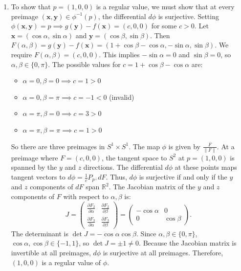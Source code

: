 \documentclass{article}
\begin{document}
\begin{enumerate}[label=\fbox{\arabic*}]
  \item %
        To show that $p = (1, 0, 0)$ is a regular value, we must show that at every preimage $(\boldsymbol{x}, \boldsymbol{y}) \in \phi^{-1}(p)$, the differential $d\phi$ is surjective.
        Setting $\phi(\boldsymbol{x}, \boldsymbol{y}) = p \implies g(\boldsymbol{y}) - f(\boldsymbol{x}) = (c, 0, 0)$ for some $c > 0$.
        Let $\boldsymbol{x} = (\cos \alpha, \sin \alpha)$ and $\boldsymbol{y} = (\cos \beta, \sin \beta)$. Then $F(\alpha, \beta) = g(\boldsymbol{y}) - f(\boldsymbol{x}) = (1+\cos\beta-\cos\alpha, -\sin\alpha, \sin\beta)$.
        We require $F(\alpha, \beta) = (c, 0, 0)$. This implies $-\sin\alpha = 0$ and $\sin\beta = 0$, so $\alpha, \beta \in \{0, \pi\}$.
        The possible values for $c = 1+\cos\beta-\cos\alpha$ are:
        \begin{itemize}
          \item $\alpha = 0, \beta = 0 \implies c = 1 > 0$
          \item $\alpha = 0, \beta = \pi \implies c = -1 < 0$ (invalid)
          \item $\alpha = \pi, \beta = 0 \implies c = 3 > 0$
          \item $\alpha = \pi, \beta = \pi \implies c = 1 > 0$
        \end{itemize}
        So there are three preimages in $S^1 \times S^1$.
        The map $\phi$ is given by $\frac{F}{\|F\|}$. At a preimage where $F = (c, 0, 0)$, the tangent space to $S^2$ at $p = (1, 0, 0)$ is spanned by the $y$ and $z$ directions.
        The differential $d\phi$ at these points maps tangent vectors to $d\phi = \frac{1}{c} P_{p^\perp} dF$. Thus, $d\phi$ is surjective if and only if the $y$ and $z$ components of $dF$ span $\mathbb{R}^2$.
        The Jacobian matrix of the $y$ and $z$ components of $F$ with respect to $\alpha, \beta$ is:
        \[
          J = \begin{pmatrix} \frac{\partial F_2}{\partial \alpha} & \frac{\partial F_2}{\partial \beta} \\ \frac{\partial F_3}{\partial \alpha} & \frac{\partial F_3}{\partial \beta} \end{pmatrix} = \begin{pmatrix} -\cos\alpha & 0 \\ 0 & \cos\beta \end{pmatrix}.
        \]
        The determinant is $\det J = -\cos\alpha \cos\beta$.
        Since $\alpha, \beta \in \{0, \pi\}$, $\cos\alpha, \cos\beta \in \{-1, 1\}$, so $\det J = \pm 1 \neq 0$.
        Because the Jacobian matrix is invertible at all preimages, $d\phi$ is surjective at all preimages.
        Therefore, $(1, 0, 0)$ is a regular value of $\phi$.


\end{enumerate}
\end{document}

